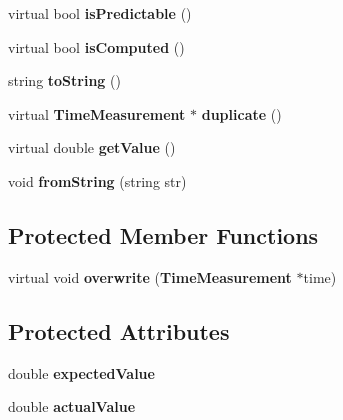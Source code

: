 \begin{CompactItemize}
\item 
virtual bool \textbf{isPredictable} ()\label{classbr_1_1pucrio_1_1telemidia_1_1ginga_1_1ncl_1_1model_1_1time_1_1TimeMeasurement_1ecd2f268097e431f67172b7329537a5}

\item 
virtual bool \textbf{isComputed} ()\label{classbr_1_1pucrio_1_1telemidia_1_1ginga_1_1ncl_1_1model_1_1time_1_1TimeMeasurement_c580d378b78f32d339d70fb04a67eebe}

\item 
string \textbf{toString} ()\label{classbr_1_1pucrio_1_1telemidia_1_1ginga_1_1ncl_1_1model_1_1time_1_1TimeMeasurement_2a35b0d68ef09ad99a22fa8563e1797f}

\item 
virtual {\bf TimeMeasurement} $\ast$ \textbf{duplicate} ()\label{classbr_1_1pucrio_1_1telemidia_1_1ginga_1_1ncl_1_1model_1_1time_1_1TimeMeasurement_529fed3d20fe7fd1875a64cbe1e62412}

\item 
virtual double \textbf{getValue} ()\label{classbr_1_1pucrio_1_1telemidia_1_1ginga_1_1ncl_1_1model_1_1time_1_1TimeMeasurement_0cb225eab86d5b3aef10112e21c34ae7}

\item 
void \textbf{fromString} (string str)\label{classbr_1_1pucrio_1_1telemidia_1_1ginga_1_1ncl_1_1model_1_1time_1_1TimeMeasurement_eebb7d9d1df4f9686d720c63e8d30abc}

\end{CompactItemize}
\subsection*{Protected Member Functions}
\begin{CompactItemize}
\item 
virtual void \textbf{overwrite} ({\bf TimeMeasurement} $\ast$time)\label{classbr_1_1pucrio_1_1telemidia_1_1ginga_1_1ncl_1_1model_1_1time_1_1TimeMeasurement_0e1075d2dc76dbc0a8b9ea28dfe01864}

\end{CompactItemize}
\subsection*{Protected Attributes}
\begin{CompactItemize}
\item 
double {\bf expectedValue}\label{classbr_1_1pucrio_1_1telemidia_1_1ginga_1_1ncl_1_1model_1_1time_1_1TimeMeasurement_af44ad2f0ee72c6166c5da26ffa855fe}

\item 
double {\bf actualValue}\label{classbr_1_1pucrio_1_1telemidia_1_1ginga_1_1ncl_1_1model_1_1time_1_1TimeMeasurement_a3c6433c7b36b0141cfda1e746047e25}

\end{CompactItemize}


